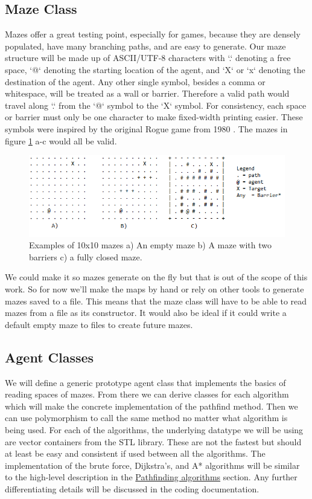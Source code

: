 \documentclass[letterpaper,12pt]{article}  %
\begin{document}
\subsection{Maze Class}

Mazes offer a great testing point, especially for games, because they are 
densely populated, have many branching paths, and are easy to generate. Our 
maze structure will be made up of ASCII/UTF-8 characters with `.` denoting a 
free space, `@` denoting the starting location of the agent, and `X` or `x` 
denoting the destination of the agent. Any other single symbol, besides a comma 
or whitespace, will be treated as a wall or barrier. Therefore a valid path 
would travel along `.` from the `@` symbol to the `X` symbol. For consistency, 
each space or barrier must only be one character to make fixed-width printing 
easier. These symbols were inspired by the original Rogue game from 1980 \cite{ 
RogueVideoGame2022}. The mazes in figure \ref{fig:mazes} a-c would all be valid.

\begin{figure}[h]  %
	\centering  %
	\includegraphics[width = 9 cm ]{NPC_Racer_Maze_Examples.png}
	\caption{Examples of 10x10 mazes a) An empty maze b) A maze with two 
	barriers c) a fully closed maze.}
	\label{fig:mazes}
\end{figure}

We could make it so mazes generate on the fly but that is out of the scope of 
this work. So for now we'll make the maps by hand or rely on other tools to 
generate mazes saved to a file. This means that the maze class will have to be 
able to read mazes from a file as its constructor. It would also be ideal if it 
could write a default empty maze to files to create future mazes.

\subsection{Agent Classes}
We will define a generic prototype agent class that implements the basics of 
reading spaces of mazes. From there we can derive classes for each algorithm 
which will make the concrete implementation of the pathfind method. Then we can 
use polymorphism to call the same method no matter what algorithm is being 
used. For each of the algorithms, the underlying datatype we will be using are 
vector containers from the STL library. These are not the fastest but should at 
least be easy and consistent if used between all the algorithms. The 
implementation of the brute force, Dijkstra’s, and A* algorithms will be 
similar to the high-level description in the 
\hyperref[section:Pathfinding_Algorithms]{Pathfinding algorithms} section. Any 
further differentiating details will be discussed in the coding documentation.
\end{document}
